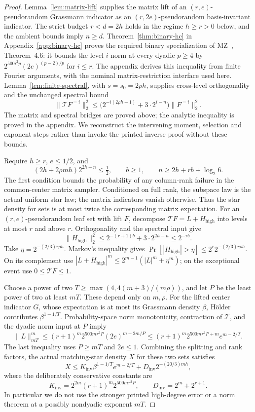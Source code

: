 \begin{proof}
Lemma~\ref{lem:matrix-lift} supplies the matrix lift of an
$(r,e)$-pseudorandom Grassmann indicator as an $(r,2e)$-pseudorandom
basis-invariant indicator. The strict budget $r<d=2h$ holds in the
regime $h\ge r>0$ below, and the ambient bounds imply $n\ge d$.
Theorem~\ref{thm:binary-hc} in Appendix~\ref{app:binary-hc} proves
the required binary specialization of MZ~\cite{MZ}, Theorem~4.6:
it bounds the level-$i$ norm at every dyadic $p\ge4$ by
$2^{500i^2p}(2e)^{(p-2)/p}$ for $i\le r$.
The appendix derives this inequality from finite Fourier arguments,
with the nominal matrix-restriction interface used here.
Lemma~\ref{lem:finite-spectral}, with $s=s_0=2\rho h$, supplies
cross-level orthogonality and the unchanged spectral bound
\[
 \|\mathcal T F^{=i}\|_2^2
 \le \bigl(2^{-i(2\rho h-1)}+3\cdot2^{i-n}\bigr)
       \|F^{=i}\|_2^2.
\]
The matrix and spectral bridges are proved above; the analytic inequality is proved in the appendix.
We reconstruct the intervening moment, selection and exponent steps
rather than invoke the printed inverse proof without these bounds.

Require $h\ge r$, $e\le1/2$, and
\[
 (2h+2\rho mh)2^{2h-n}\le\tfrac12,\qquad
 b\ge1,\qquad n\ge2h+rb+\log_2 6.
\]
The first condition bounds the probability of any column-rank failure
in the common-center matrix sampler. Conditioned on full rank, the
subspace law is the actual uniform star law; the matrix indicators
vanish otherwise. Thus the star density for sets is at most twice
the corresponding matrix expectation.
For an $(r,e)$-pseudorandom leaf set with lift $F$, decompose
$\mathcal T F=L+H_{\mathrm{high}}$ into levels at most $r$ and above $r$.
Orthogonality and the spectral input give
\[
 \|H_{\mathrm{high}}\|_2^2
 \le2^{-(r+1)b}+3\cdot2^{2h-n}\le2^{-rb}.
\]
Take $\eta=2^{-(2/3)r\rho h}$. Markov's inequality gives
$\Pr[|H_{\mathrm{high}}|>\eta]\le2^r2^{-(2/3)r\rho h}$.
On its complement use
$|L+H_{\mathrm{high}}|^m\le2^{m-1}(|L|^m+\eta^m)$;
on the exceptional event use $0\le\mathcal TF\le1$.

Choose a power of two
$T\ge\max(4,4(m+3)/(m\rho))$, and let $P$ be the least power of two
at least $mT$. These depend only on $m,\rho$.
For the lifted center indicator $G$, whose expectation is at most its
Grassmann density $\beta$, H\"older contributes $\beta^{1-1/T}$.
Probability-space norm monotonicity, contraction of $\mathcal T$,
and the dyadic norm input at $P$ imply
\[
 \|L\|_{mT}^m
 \le(r+1)^m2^{500mr^2P}(2e)^{m-2m/P}
 \le(r+1)^m2^{500mr^2P+m}e^{m-2/T}.
\]
The last inequality uses $P\ge mT$ and $2e\le1$.
Combining the splitting and rank factors, the actual matching-star
density $X$ for these two sets satisfies
\[
 X\le K_{\mathrm{inv}}\beta^{1-1/T}e^{m-2/T}
       +D_{\mathrm{inv}}2^{-(20/3)mh},
\]
where the deliberately conservative constants are
\[
 K_{\mathrm{inv}}=2^{2m}(r+1)^m2^{500mr^2P},\qquad
 D_{\mathrm{inv}}=2^m+2^{r+1}.
\]
In particular we do not use the stronger printed high-degree error
or a norm theorem at a possibly nondyadic exponent $mT$.


\end{proof}

